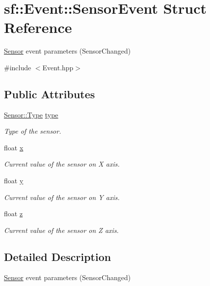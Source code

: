 \hypertarget{structsf_1_1_event_1_1_sensor_event}{\section{sf\-:\-:Event\-:\-:Sensor\-Event Struct Reference}
\label{structsf_1_1_event_1_1_sensor_event}
}


\hyperlink{classsf_1_1_sensor}{Sensor} event parameters (Sensor\-Changed)  




{\ttfamily \#include $<$Event.\-hpp$>$}

\subsection*{Public Attributes}
\begin{DoxyCompactItemize}
\item 
\hyperlink{classsf_1_1_sensor_a687375af3ab77b818fca73735bcaea84}{Sensor\-::\-Type} \hyperlink{structsf_1_1_event_1_1_sensor_event_abee7d67bf0947fd1138e4466011e2436}{type}
\begin{DoxyCompactList}\small\item\em Type of the sensor. \end{DoxyCompactList}\item 
float \hyperlink{structsf_1_1_event_1_1_sensor_event_aa6ccbd13c181b866a6467462158d93d9}{x}
\begin{DoxyCompactList}\small\item\em Current value of the sensor on X axis. \end{DoxyCompactList}\item 
float \hyperlink{structsf_1_1_event_1_1_sensor_event_aecafcd25ecb3ba486e42284e4bb69a57}{y}
\begin{DoxyCompactList}\small\item\em Current value of the sensor on Y axis. \end{DoxyCompactList}\item 
float \hyperlink{structsf_1_1_event_1_1_sensor_event_a5704e0d0b82b07f051cc858894f3ea43}{z}
\begin{DoxyCompactList}\small\item\em Current value of the sensor on Z axis. \end{DoxyCompactList}\end{DoxyCompactItemize}


\subsection{Detailed Description}
\hyperlink{classsf_1_1_sensor}{Sensor} event parameters (Sensor\-Changed) 

